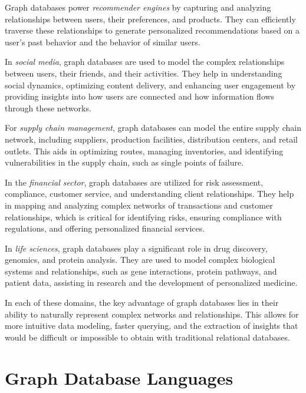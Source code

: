 Graph databases power \emph{recommender engines} by capturing and analyzing relationships between users, their preferences, and products. They can efficiently traverse these relationships to generate personalized recommendations based on a user's past behavior and the behavior of similar users.

In \emph{social media}, graph databases are used to model the complex relationships between users, their friends, and their activities. They help in understanding social dynamics, optimizing content delivery, and enhancing user engagement by providing insights into how users are connected and how information flows through these networks.

For \emph{supply chain management}, graph databases can model the entire supply chain network, including suppliers, production facilities, distribution centers, and retail outlets. This aids in optimizing routes, managing inventories, and identifying vulnerabilities in the supply chain, such as single points of failure.

In the \emph{financial sector}, graph databases are utilized for risk assessment, compliance, customer service, and understanding client relationships. They help in mapping and analyzing complex networks of transactions and customer relationships, which is critical for identifying risks, ensuring compliance with regulations, and offering personalized financial services.

In \emph{life sciences}, graph databases play a significant role in drug discovery, genomics, and protein analysis. They are used to model complex biological systems and relationships, such as gene interactions, protein pathways, and patient data, assisting in research and the development of personalized medicine.

In each of these domains, the key advantage of graph databases lies in their ability to naturally represent complex networks and relationships. This allows for more intuitive data modeling, faster querying, and the extraction of insights that would be difficult or impossible to obtain with traditional relational databases.

\section{Graph Database Languages}

